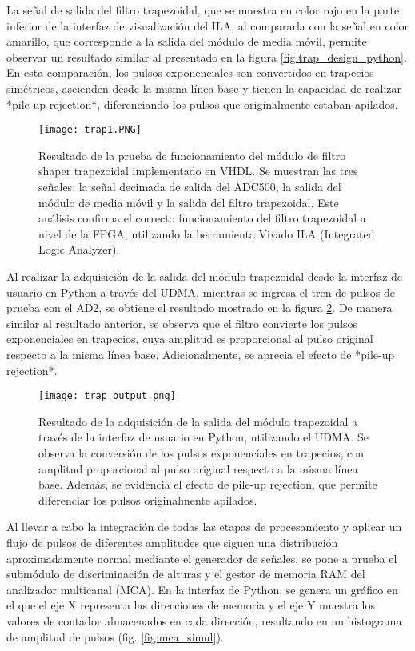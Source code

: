 \documentclass{report}
\begin{document}
\noindent La señal de salida del filtro trapezoidal, que se muestra en color rojo en la parte inferior de la interfaz de visualización del ILA, al compararla con la señal en color amarillo, que corresponde a la salida del módulo de media móvil, permite observar un resultado similar al presentado en la figura \ref{fig:trap_design_python}. En esta comparación, los pulsos exponenciales son convertidos en trapecios simétricos, ascienden desde la misma línea base y tienen la capacidad de realizar *pile-up rejection*, diferenciando los pulsos que originalmente estaban apilados.

\begin{figure}[H]
    \centering
    \texttt{[image: trap1.PNG]}
    \caption{Resultado de la prueba de funcionamiento del módulo de filtro shaper trapezoidal implementado en VHDL. Se muestran las tres señales: la señal decimada de salida del ADC500, la salida del módulo de media móvil y la salida del filtro trapezoidal. Este análisis confirma el correcto funcionamiento del filtro trapezoidal a nivel de la FPGA, utilizando la herramienta Vivado ILA (Integrated Logic Analyzer).}
    \label{fig:ILAtrap}
\end{figure}

\noindent Al realizar la adquisición de la salida del módulo trapezoidal desde la interfaz de usuario en Python a través del UDMA, mientras se ingresa el tren de pulsos de prueba con el AD2, se obtiene el resultado mostrado en la figura \ref{fig:trap_output}. De manera similar al resultado anterior, se observa que el filtro convierte los pulsos exponenciales en trapecios, cuya amplitud es proporcional al pulso original respecto a la misma línea base. Adicionalmente, se aprecia el efecto de *pile-up rejection*.

\begin{figure}[H]
    \centering
    \texttt{[image: trap\_output.png]}
    \caption{Resultado de la adquisición de la salida del módulo trapezoidal a través de la interfaz de usuario en Python, utilizando el UDMA. Se observa la conversión de los pulsos exponenciales en trapecios, con amplitud proporcional al pulso original respecto a la misma línea base. Además, se evidencia el efecto de pile-up rejection, que permite diferenciar los pulsos originalmente apilados.}
    \label{fig:trap_output}
\end{figure}

\noindent Al llevar a cabo la integración de todas las etapas de procesamiento y aplicar un flujo de pulsos de diferentes amplitudes que siguen una distribución aproximadamente normal mediante el generador de señales, se pone a prueba el submódulo de discriminación de alturas y el gestor de memoria RAM del analizador multicanal (MCA). En la interfaz de Python, se genera un gráfico en el que el eje X representa las direcciones de memoria y el eje Y muestra los valores de contador almacenados en cada dirección, resultando en un histograma de amplitud de pulsos (fig. \ref{fig:mca_simul}).
\end{document}
